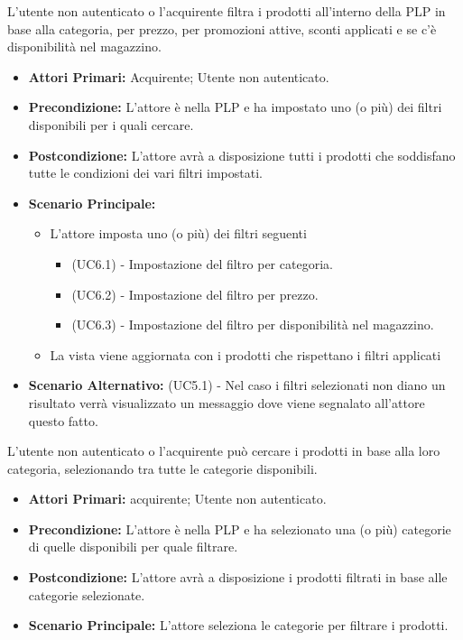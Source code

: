 L'utente non autenticato o l'acquirente filtra i prodotti all'interno della PLP in base alla categoria, per prezzo, per promozioni attive, sconti applicati e se c'è disponibilità nel magazzino.
\begin{itemize}
    \item \textbf{Attori Primari:} Acquirente; Utente non autenticato.
    \item \textbf{Precondizione:} L'attore è nella PLP e ha impostato uno (o più) dei filtri disponibili per i quali cercare.
    \item \textbf{Postcondizione:} L'attore avrà a disposizione tutti i prodotti che soddisfano tutte le condizioni dei vari filtri impostati.
    \item \textbf{Scenario Principale:}
    \begin{itemize}
        \item L'attore imposta uno (o più) dei filtri seguenti 
        \begin{itemize}
            \item (UC6.1) - Impostazione del filtro per categoria.
            \item (UC6.2) - Impostazione del filtro per prezzo.
            \item (UC6.3) - Impostazione del filtro per disponibilità nel magazzino.
        \end{itemize}
        \item La vista viene aggiornata con i prodotti che rispettano i filtri applicati
    \end{itemize}
    \item \textbf{Scenario Alternativo:} (UC5.1) - Nel caso i filtri selezionati non diano un risultato verrà visualizzato un messaggio dove viene segnalato all'attore questo fatto.
\end{itemize}

\resetSubUC

L'utente non autenticato o l'acquirente può cercare i prodotti in base alla loro categoria, selezionando tra tutte le categorie disponibili.
\begin{itemize}
    \item \textbf{Attori Primari:} acquirente; Utente non autenticato.
    \item \textbf{Precondizione:} L'attore è nella PLP e ha selezionato una (o più) categorie di quelle disponibili per quale filtrare.
    \item \textbf{Postcondizione:} L'attore avrà a disposizione i prodotti filtrati in base alle categorie selezionate.
    \item \textbf{Scenario Principale:} L'attore seleziona le categorie per filtrare i prodotti.
\end{itemize}

